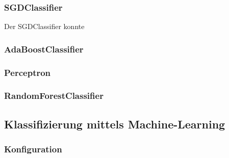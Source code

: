 \subsubsection{SGDClassifier}
Der SGDClassifier konnte 
\subsubsection{AdaBoostClassifier}
\subsubsection{Perceptron}
\subsubsection{RandomForestClassifier}
\subsection{Klassifizierung mittels Machine-Learning}
\subsubsection{Konfiguration}
\subsubsection{}
